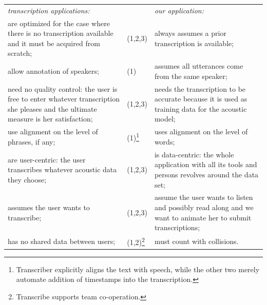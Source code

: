 \documentclass{svproc}
\begin{document}
\noindent
\begin{tabularx}{\textwidth}{
    @{\hspace{1.5em}}%
    >{{\hsize=0.9\hsize}\leavevmode\llap{\textbullet~}\raggedright}%
    X%
    @{\hspace{0.2em}}
    >{\hsize=0.2\hsize}
    X
    @{\quad\hspace{1.5em}}%
    >{\leavevmode\llap{\textbullet~}\raggedright\arraybackslash}%
    X%
    @{}%
  }
  \em{transcription applications}: & & \em{our application}: \\
  are optimized for the case where there is no transcription available and it
  must be acquired from scratch; &
    (1,2,3) &
      always assumes a prior transcription is available; \\

  allow annotation of speakers; &
    (1) &
      assumes all utterances come from the same speaker; \\

  need no quality control: the user is free to enter whatever transcription she
  pleases and the ultimate measure is her satisfaction; &
    (1,2,3) &
      needs the transcription to be accurate because it is used as training data
      for the acoustic model; \\

  use alignment on the level of phrases, if any; &
    (1)\footnote{
        Transcriber explicitly aligns the text with speech, while the
        other two merely automate addition of timestamps into the transcription.
    } &
      uses alignment on the level of words; \\

  are user-centric: the user transcribes whatever acoustic data they choose; &
    (1,2,3) &
      is data-centric: the whole application with all its tools and persons
      revolves around the data set; \\

  assumes the user wants to transcribe; &
    (1,2,3) &
      assume the user wants to listen and possibly read along and we want to
      animate her to submit transcriptions; \\

  has no shared data between users; &
    (1,2)\footnote{Transcribe supports team co-operation.} &
      must count with collisions. \\
\end{tabularx}
\end{document}
